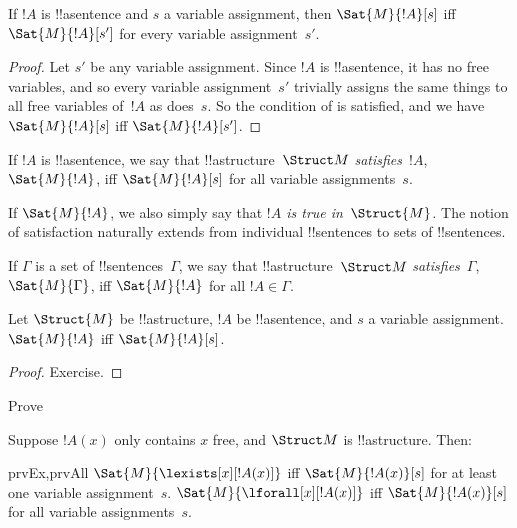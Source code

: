 \begin{cor}
If $!A$ is !!a{sentence} and $s$ a variable assignment, then
$\Sat{M}{!A}[s]$ iff $\Sat{M}{!A}[s']$ for every variable
assignment~$s'$.
\end{cor}

\begin{proof}
  Let $s'$ be any variable assignment. Since $!A$ is !!a{sentence}, it
  has no free variables, and so every variable assignment~$s'$
  trivially assigns the same things to all free variables of~$!A$ as
  does~$s$. So the condition of  is satisfied,
  and we have $\Sat{M}{!A}[s]$ iff $\Sat{M}{!A}[s']$.
\end{proof}

\begin{defn}
If $!A$ is !!a{sentence}, we say that !!a{structure}~$\Struct M$
\emph{satisfies}~$!A$, $\Sat{M}{!A}$, iff $\Sat{M}{!A}[s]$ for all
variable assignments~$s$.
\end{defn}

If $\Sat{M}{!A}$, we also simply say that \emph{$!A$ is true
in~$\Struct{M}$.} The notion of satisfaction naturally extends
from individual !!{sentence}s to sets of !!{sentence}s.

\begin{defn}
If $\Gamma$ is a set of !!{sentence}s~$\Gamma$, we say that
!!a{structure}~$\Struct M$ \emph{satisfies}~$\Gamma$,
$\Sat{M}{\Gamma}$, iff $\Sat{M}{!A}$ for all $!A \in \Gamma$.
\end{defn}

\begin{prop}
  Let $\Struct{M}$ be !!a{structure}, $!A$ be !!a{sentence}, and $s$ a
  variable assignment.  $\Sat{M}{!A}$ iff $\Sat{M}{!A}[s]$.
\end{prop}

\begin{proof}
Exercise.
\end{proof}

\begin{prob}
Prove 
\end{prob}

\begin{prop}
  Suppose $!A(x)$ only contains $x$ free, and $\Struct M$ is
  !!a{structure}. Then:
  \begin{tagenumerate}{prvEx,prvAll}
    $\Sat{M}{\lexists[x][!A(x)]}$ iff $\Sat{M}{!A(x)}[s]$
      for at least one variable assignment~$s$.
    $\Sat{M}{\lforall[x][!A(x)]}$ iff $\Sat{M}{!A(x)}[s]$
  for all variable assignments~$s$.
\end{tagenumerate}
\end{prop}

